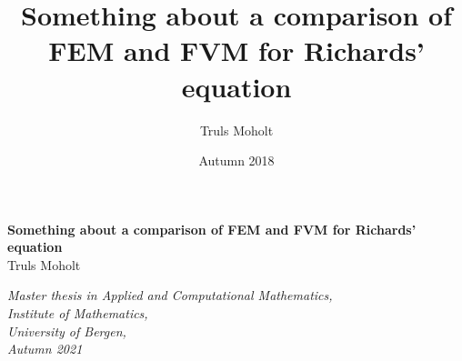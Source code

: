 \documentclass[12pt,oneside]{book}
\author{Truls Moholt}
\title{\vspace{-3.0cm}Something about a comparison of FEM and FVM for Richards' equation}
\date{Autumn 2018}
\numberwithin{equation}{chapter}
\theoremstyle{plain}
\begin{document}
\titlepage
\begin{center}
{\bf \LARGE Something about a comparison of FEM and FVM for Richards' equation}\\
\vspace{10\in}
\vspace{150\in}
{\large Truls Moholt\\ \vspace{30\in}}

\vspace*{\fill}
\it{Master thesis in Applied and Computational Mathematics, \\Institute of Mathematics, \\University of Bergen, \\Autumn 2021}
\end{center}
\tableofcontents
\newpage
%












\end{document}
